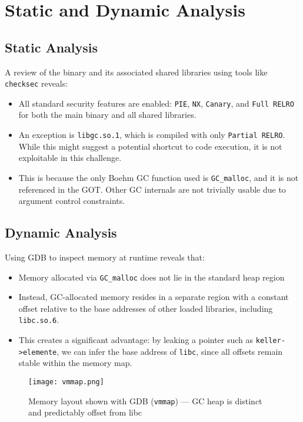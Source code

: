 \documentclass[a4paper,11pt]{article}
\begin{document}
\section{Static and Dynamic Analysis}

\subsection*{Static Analysis}

A review of the binary and its associated shared libraries using tools like \texttt{checksec} reveals:

\begin{itemize}
    \item All standard security features are enabled: \texttt{PIE}, \texttt{NX}, \texttt{Canary}, and \texttt{Full RELRO} for both the main binary and all shared libraries.
    \item An exception is \texttt{libgc.so.1}, which is compiled with only \texttt{Partial RELRO}. While this might suggest a potential shortcut to code execution, it is not exploitable in this challenge.
    \item This is because the only Boehm GC function used is \texttt{GC\_malloc}, and it is not referenced in the GOT. Other GC internals are not trivially usable due to argument control constraints.
\end{itemize}

\subsection*{Dynamic Analysis}

Using GDB to inspect memory at runtime reveals that:

\begin{itemize}
    \item Memory allocated via \texttt{GC\_malloc} does not lie in the standard heap region 
    \item Instead, GC-allocated memory resides in a separate region with a constant offset relative to the base addresses of other loaded libraries, including \texttt{libc.so.6}.
    \item This creates a significant advantage: by leaking a pointer such as \texttt{keller->elemente}, we can infer the base address of \texttt{libc}, since all offsets remain stable within the memory map.
\end{itemize}

\begin{figure}[h!]
    \centering
    \texttt{[image: vmmap.png]}
    \caption{Memory layout shown with GDB (\texttt{vmmap}) — GC heap is distinct and predictably offset from libc}
    \label{fig:enter-label}
\end{figure}
\end{document}
